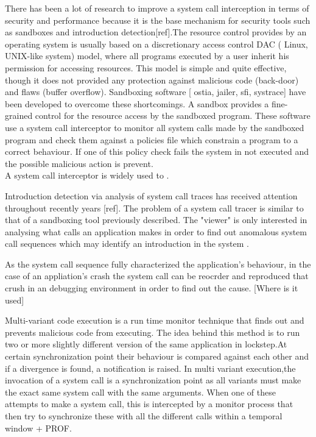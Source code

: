 There has been a lot of research to improve a system call interception in terms of security and performance because it is the base mechanism for security tools such as sandboxes and introduction detection[ref].The resource control provides by an operating system is usually based on a discretionary access control DAC ( Linux, UNIX-like system) model, where all programs executed by a user inherit his permission for accessing resources. This model is simple and quite effective, though it does not provided any protection against malicious code (back-door) and flaws (buffer overflow). Sandboxing software [ ostia, jailer, sfi, systrace] have been developed to overcome these shortcomings. A sandbox provides a fine-grained control for the resource access by the sandboxed program. These software use a system call interceptor to monitor all system calls made by the sandboxed program and check them against a policies file which constrain a program to a correct behaviour. If one of this policy check fails the system in not executed and the possible malicious action is prevent. 
\\
A system call interceptor is widely used to . 

% 
Introduction detection via analysis of system call traces has received attention throughout recently years [ref]. The problem of a system call tracer is similar to that of a sandboxing tool previously described. The "viewer" is only interested in analysing what calls an application makes in order to find out anomalous system call sequences which may  identify an introduction in the system \cite{introd_detection}. 



As the system call sequence fully characterized the application's behaviour, in the case of an appliation's crash the system call can be reocrder and reproduced that crush in an debugging environment  in order to find out the cause.  [Where is it used] 

Multi-variant code execution is a run time monitor technique that finds out and prevents malicious code from executing. The idea behind this method is to run two or more slightly different version of the same application in lockstep.At certain synchronization point their behaviour is compared against each other and if a divergence is found, a notification is raised. In multi variant execution,the invocation of a system call is a synchronization point as all variants must make the exact same system call with the same arguments. When one of these attempts to make a system call, this is intercepted by a monitor process that then try to synchronize these with all the different calls within a temporal window \cite{orchestra} + PROF. 


